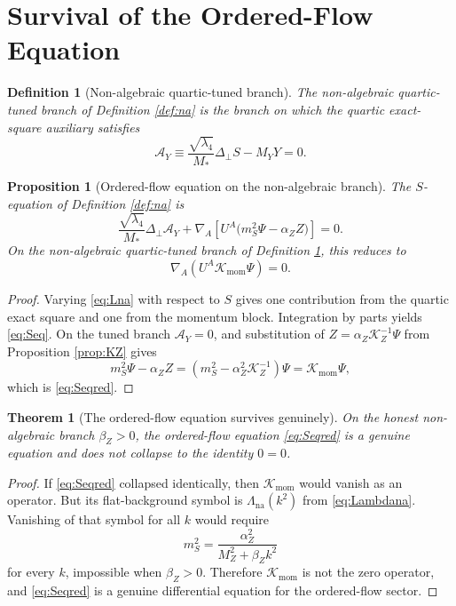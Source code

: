 \documentclass[11pt]{article}
\newcommand{\AY}{\mathcal A_Y}
\newcommand{\KZ}{\mathcal K_Z}
\newcommand{\Kmom}{\mathcal K_{\mathrm{mom}}}
\newtheorem{definition}{Definition}
\newtheorem{proposition}{Proposition}
\newtheorem{theorem}{Theorem}
\begin{document}
\section{Survival of the Ordered-Flow Equation}

\begin{definition}[Non-algebraic quartic-tuned branch]
\label{def:tuned}
The \emph{non-algebraic quartic-tuned branch} of Definition \ref{def:na} is the branch on which the quartic exact-square auxiliary satisfies
\begin{equation}
\AY
\equiv
\frac{\sqrt{\lambda_4}}{M_*}\Delta_\perp S-M_YY
=
0.
\label{eq:AY}
\end{equation}
\end{definition}

\begin{proposition}[Ordered-flow equation on the non-algebraic branch]
\label{prop:Seq}
The \(S\)-equation of Definition \ref{def:na} is
\begin{equation}
\frac{\sqrt{\lambda_4}}{M_*}\Delta_\perp\AY
+\nabla_A\!\left[U^A\bigl(m_S^2\Psi-\alpha_ZZ\bigr)\right]
=
0.
\label{eq:Seq}
\end{equation}
On the non-algebraic quartic-tuned branch of Definition \ref{def:tuned}, this reduces to
\begin{equation}
\nabla_A\!\left(U^A\Kmom\Psi\right)=0.
\label{eq:Seqred}
\end{equation}
\end{proposition}

\begin{proof}
Varying \eqref{eq:Lna} with respect to \(S\) gives one contribution from the quartic exact square and one from the momentum block. Integration by parts yields \eqref{eq:Seq}. On the tuned branch \(\AY=0\), and substitution of \(Z=\alpha_Z\KZ^{-1}\Psi\) from Proposition \ref{prop:KZ} gives
\[
m_S^2\Psi-\alpha_ZZ
=
\left(m_S^2-\alpha_Z^2\KZ^{-1}\right)\Psi
=
\Kmom\Psi,
\]
which is \eqref{eq:Seqred}.
\end{proof}

\begin{theorem}[The ordered-flow equation survives genuinely]
\label{thm:genuine}
On the honest non-algebraic branch \(\beta_Z>0\), the ordered-flow equation \eqref{eq:Seqred} is a genuine equation and does not collapse to the identity \(0=0\).
\end{theorem}

\begin{proof}
If \eqref{eq:Seqred} collapsed identically, then \(\Kmom\) would vanish as an operator. But its flat-background symbol is \(\Lambda_{\mathrm{na}}(k^2)\) from \eqref{eq:Lambdana}. Vanishing of that symbol for all \(k\) would require
\[
m_S^2=\frac{\alpha_Z^2}{M_Z^2+\beta_Zk^2}
\]
for every \(k\), impossible when \(\beta_Z>0\). Therefore \(\Kmom\) is not the zero operator, and \eqref{eq:Seqred} is a genuine differential equation for the ordered-flow sector.
\end{proof}
\end{document}
